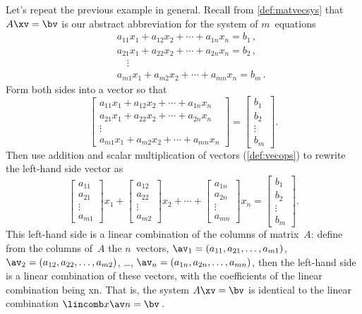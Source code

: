 \begin{example} \label{eg:lcmatvec}
Let's repeat the previous example in general.
Recall from \autoref{def:matvecsys} that \(A\xv=\bv\) is our abstract abbreviation for the system of \(m\)~equations
\begin{eqnarray*}
&&a_{11}x_1+a_{12}x_2+\cdots+a_{1n}x_n=b_1\,,
\\&&a_{21}x_1+a_{22}x_2+\cdots+a_{2n}x_n=b_2\,,
\\&&\quad\vdots
\\&&a_{m1}x_1+a_{m2}x_2+\cdots+a_{mn}x_n=b_m\,.
\end{eqnarray*}
Form both sides into a vector so that
\begin{equation*}
\begin{bmatrix} 
a_{11}x_1+a_{12}x_2+\cdots+a_{1n}x_n
\\a_{21}x_1+a_{22}x_2+\cdots+a_{2n}x_n
\\\vdots
\\a_{m1}x_1+a_{m2}x_2+\cdots+a_{mn}x_n
\end{bmatrix}
=\begin{bmatrix}b_1\\b_2\\\vdots\\b_m \end{bmatrix}.
\end{equation*}
Then use addition and scalar multiplication of vectors (\autoref{def:vecops}) to rewrite the left-hand side vector as
\begin{equation*}
\begin{bmatrix} a_{11}\\a_{21}\\\vdots\\a_{m1}\end{bmatrix}x_1
+\begin{bmatrix} a_{12}\\a_{22}\\\vdots\\a_{m2}\end{bmatrix}x_2
+\cdots
+\begin{bmatrix} a_{1n}\\a_{2n}\\\vdots\\a_{mn}\end{bmatrix}x_n
=\begin{bmatrix} b_1\\b_2\\\vdots\\b_m \end{bmatrix}.
\end{equation*}
This left-hand side is a linear combination of the columns of matrix~\(A\): define from the columns of~\(A\) the \(n\)~vectors, \(\av_1=(a_{11},a_{21},\ldots,a_{m1})\), \(\av_2=(a_{12},a_{22},\ldots,a_{m2})\), \ldots, \(\av_n=(a_{1n},a_{2n},\ldots,a_{mn})\), then the left-hand side is a linear combination of these vectors, with the coefficients of the linear combination being \hlist xn.
That is, the system \(A\xv=\bv\) is identical to the linear combination \(\lincomb x\av n=\bv\)\,.
\end{example}

